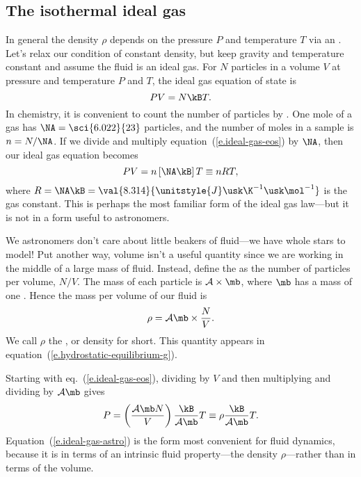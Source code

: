 \subsection{The isothermal ideal gas}\label{s.ideal-gas}

In general the density $\rho$ depends on the pressure $P$ and temperature $T$ via an . Let's relax our condition of constant density, but keep gravity and temperature constant and assume the fluid is an ideal gas. For $N$ particles in a volume $V$ at pressure and temperature $P$ and $T$, the ideal gas equation of state is
\begin{equation}\label{e.ideal-gas-eos}
PV = N\kB T.
\end{equation}
In chemistry, it is convenient to count the number of particles by .  One mole of a gas has $\NA = \sci{6.022}{23}$ particles, and the number of moles in a sample is $n = N/\NA$.  If we divide and multiply equation~(\ref{e.ideal-gas-eos}) by $\NA$, then our ideal gas equation becomes
\[ PV = n\left[\NA \kB\right]T \equiv n R T, \]
where $R = \NA\kB = \val{8.314}{\unitstyle{J}\usk\K^{-1}\usk\mol^{-1}}$ is the gas constant. This is perhaps the most familiar form of the ideal gas law---but it is not in a form useful to astronomers.

We astronomers don't care about little beakers of fluid---we have whole stars to model! Put another way, volume isn't a useful quantity since we are working in the middle of a large mass of fluid. Instead, define the  as the number of particles per volume, $N/V$. The mass of each particle is $\mathcal{A}\times\mb$, where $\mb$ has a mass of one . Hence the mass per volume of our fluid is
\[
	\rho = \mathcal{A}\mb \times\frac{N}{V}.
\]
We call $\rho$ the , or density for short. This quantity appears in equation~(\ref{e.hydrostatic-equilibrium-g}).

Starting with eq.~(\ref{e.ideal-gas-eos}), dividing by $V$ and then multiplying and dividing by $\mathcal{A}\mb$ gives
\begin{equation}\label{e.ideal-gas-astro}
 P = \left(\frac{\mathcal{A}\mb N}{V}\right)\frac{\kB}{\mathcal{A}\mb} T \equiv \rho \frac{\kB}{\mathcal{A}\mb} T.
\end{equation}
Equation~(\ref{e.ideal-gas-astro}) is the form most convenient for fluid dynamics, because it is in terms of an intrinsic fluid property---the density $\rho$---rather than in terms of the volume.

